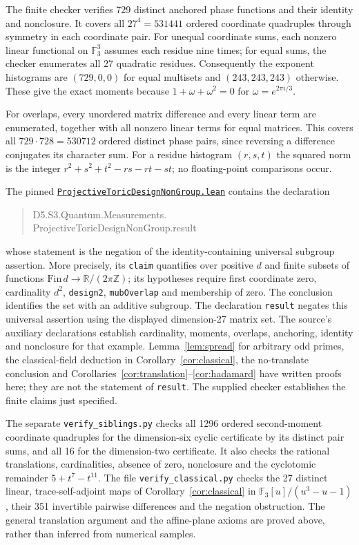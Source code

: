 \documentclass[11pt]{article}
\newcommand{\F}{\mathbb F}
\newcommand{\leanurl}{https://github.com/the-omega-institute/trureturing/blob/f7ba557ae2a5d2c3a3a519e0713d65ac86af2973/D5/S3/Quantum/Measurements/ProjectiveToricDesignNonGroup.lean}
\begin{document}
The finite checker verifies 729 distinct anchored phase functions and their identity and nonclosure. It covers all $27^4=531441$ ordered coordinate quadruples through symmetry in each coordinate pair. For unequal coordinate sums, each nonzero linear functional on $\F_3^3$ assumes each residue nine times; for equal sums, the checker enumerates all 27 quadratic residues. Consequently the exponent histograms are $(729,0,0)$ for equal multisets and $(243,243,243)$ otherwise. These give the exact moments because $1+\omega+\omega^2=0$ for $\omega=e^{2\pi i/3}$.

For overlaps, every unordered matrix difference and every linear term are enumerated, together with all nonzero linear terms for equal matrices. This covers all $729\cdot728=530712$ ordered distinct phase pairs, since reversing a difference conjugates its character sum. For a residue histogram $(r,s,t)$ the squared norm is the integer $r^2+s^2+t^2-rs-rt-st$; no floating-point comparisons occur.

The pinned \href{\leanurl}{\texttt{ProjectiveToricDesignNonGroup.lean}} contains the declaration
\begin{quote}\small\ttfamily
D5.S3.Quantum.Measurements.\\
ProjectiveToricDesignNonGroup.result
\end{quote}
whose statement is the negation of the identity-containing universal subgroup assertion. More precisely, its \texttt{claim} quantifies over positive $d$ and finite subsets of functions $\mathrm{Fin}\,d\to\mathbb R/(2\pi\mathbb Z)$; its hypotheses require first coordinate zero, cardinality $d^2$, \texttt{design2}, \texttt{mubOverlap} and membership of zero. The conclusion identifies the set with an additive subgroup. The declaration \texttt{result} negates this universal assertion using the displayed dimension-27 matrix set. The source's auxiliary declarations establish cardinality, moments, overlaps, anchoring, identity and nonclosure for that example. Lemma~\ref{lem:spread} for arbitrary odd primes, the classical-field deduction in Corollary~\ref{cor:classical}, the no-translate conclusion and Corollaries~\ref{cor:translation}--\ref{cor:hadamard} have written proofs here; they are not the statement of \texttt{result}. The supplied checker establishes the finite claims just specified.

The separate \texttt{verify\_siblings.py} checks all 1296 ordered second-moment coordinate quadruples for the dimension-six cyclic certificate by its distinct pair sums, and all 16 for the dimension-two certificate. It also checks the rational translations, cardinalities, absence of zero, nonclosure and the cyclotomic remainder $5+t^7-t^{11}$. The file \texttt{verify\_classical.py} checks the 27 distinct linear, trace-self-adjoint maps of Corollary~\ref{cor:classical} in $\F_3[u]/(u^3-u-1)$, their 351 invertible pairwise differences and the negation obstruction. The general translation argument and the affine-plane axioms are proved above, rather than inferred from numerical samples.
\end{document}
